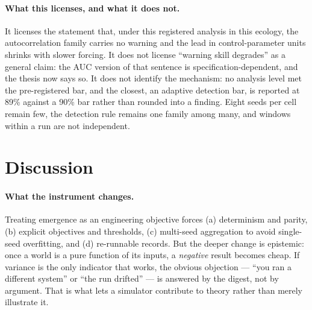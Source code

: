 \documentclass[11pt,a4paper]{article}
\begin{document}
\paragraph{What this licenses, and what it does not.} It licenses the statement
that, under this registered analysis in this ecology, the autocorrelation family
carries no warning and the lead in control-parameter units shrinks with slower
forcing. It does not license ``warning skill degrades'' as a general claim: the
AUC version of that sentence is specification-dependent, and the thesis now says
so. It does not identify the mechanism: no analysis level met the pre-registered
bar, and the closest, an adaptive detection bar, is reported at 89\% against a
90\% bar rather than rounded into a finding. Eight seeds per cell remain few, the
detection rule remains one family among many, and windows within a run are not
independent.

\section{Discussion}\label{sec:disc}
\paragraph{What the instrument changes.} Treating emergence as an engineering
objective forces (a) determinism and parity, (b) explicit objectives and
thresholds, (c) multi-seed aggregation to avoid single-seed overfitting, and (d)
re-runnable records. But the deeper change is epistemic: once a world is a pure
function of its inputs, a \emph{negative} result becomes cheap. If variance is the
only indicator that works, the obvious objection --- ``you ran a different
system'' or ``the run drifted'' --- is answered by the digest, not by argument.
That is what lets a simulator contribute to theory rather than merely illustrate
it.
\end{document}
